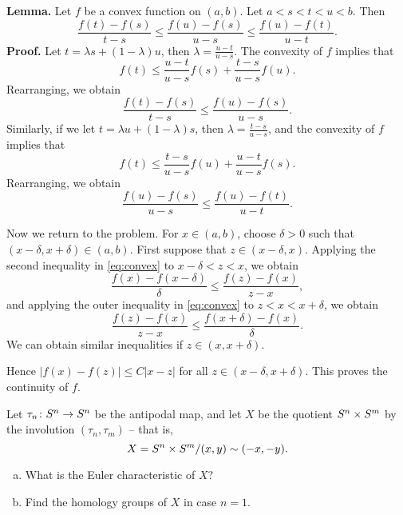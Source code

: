 
\textbf{Lemma.} Let $f$ be a convex function on $(a, b)$.  Let $a < s < t < u < b$.  Then
\begin{equation}
  \frac{f(t) - f(s)}{t-s} \leq \frac{f(u) - f(s)}{u-s} \leq \frac{f(u) - f(t)}{u-t} .
  \tag{$\dagger$} \label{eq:convex} \end{equation}
\textbf{Proof.} Let $t = \lambda s + (1 - \lambda)u$, then $\lambda = \frac{u-t}{u-s}$.  The convexity of $f$ implies that
\[
f(t) \leq \frac{u-t}{u-s}f(s) + \frac{t-s}{u-s}f(u) .
\]
Rearranging, we obtain
\[
\frac{f(t) - f(s)}{t-s} \leq \frac{f(u) - f(s)}{u-s}.
\]
Similarly, if we let $t = \lambda u + (1 - \lambda)s$, then $\lambda = \frac{t-s}{u-s}$, and the convexity of $f$ implies that
\[
f(t) \leq \frac{t-s}{u-s}f(u) + \frac{u-t}{u-s}f(s) .
\]
Rearranging, we obtain
\[
\frac{f(u) - f(s)}{u-s} \leq \frac{f(u) - f(t)}{u-t}.
\]

Now we return to the problem.  For $x \in (a, b)$, choose $\delta > 0$ such that $(x - \delta, x + \delta) \in (a, b)$.  First suppose that $z \in (x- \delta, x)$.  Applying the second inequality in \eqref{eq:convex} to $x - \delta < z < x$, we obtain
\[
\frac{f(x) - f(x-\delta)}{\delta} \leq \frac{f(z) - f(x)}{z-x},
\]
and applying the outer inequality in \eqref{eq:convex} to $z < x < x + \delta$, we obtain
\[
\frac{f(z) - f(x)}{z-x} \leq \frac{f(x + \delta) - f(x)}{\delta}.
\]
We can obtain similar inequalities if $z \in (x, x + \delta)$.

Hence $|f(x) - f(z)| \leq C|x - z|$ for all $z \in (x - \delta, x + \delta)$.  This proves the continuity of $f$.


Let $\tau_n \colon S^n \rightarrow S^n$ be the antipodal map, and let $X$ be the quotient $S^n \times S^m$ by the involution $(\tau_n, \tau_m)$ -- that is,
\[
X = S^n \times S^m/(x,y) \sim (-x,-y).
\]
\begin{enumerate}[(a)]
\item What is the Euler characteristic of $X$?
\item Find the homology groups of $X$ in case $n = 1$.
\end{enumerate}

